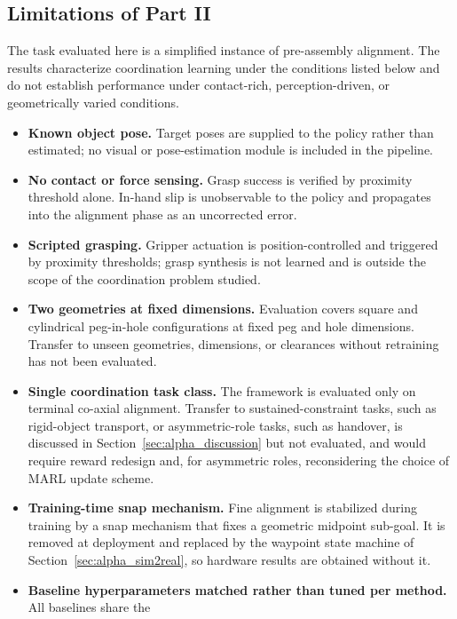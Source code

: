 \subsection{Limitations of Part II}\label{sec:alpha_limitations}

The task evaluated here is a simplified instance of pre-assembly alignment. The results characterize
coordination learning under the conditions listed below and do not establish performance under
contact-rich, perception-driven, or geometrically varied conditions.

\begin{itemize}
\item \textbf{Known object pose.} Target poses are supplied to the policy rather than estimated; no
visual or pose-estimation module is included in the pipeline.
\item \textbf{No contact or force sensing.} Grasp success is verified by proximity threshold alone.
In-hand slip is unobservable to the policy and propagates into the alignment phase as an uncorrected
error.
\item \textbf{Scripted grasping.} Gripper actuation is position-controlled and triggered by proximity
thresholds; grasp synthesis is not learned and is outside the scope of the coordination problem
studied.
\item \textbf{Two geometries at fixed dimensions.} Evaluation covers square and cylindrical
peg-in-hole configurations at fixed peg and hole dimensions. Transfer to unseen geometries,
dimensions, or clearances without retraining has not been evaluated.
\item \textbf{Single coordination task class.} The framework is evaluated only on terminal co-axial
alignment. Transfer to sustained-constraint tasks, such as rigid-object transport, or asymmetric-role
tasks, such as handover, is discussed in Section~\ref{sec:alpha_discussion} but not evaluated, and
would require reward redesign and, for asymmetric roles, reconsidering the choice of MARL update
scheme.
\item \textbf{Training-time snap mechanism.} Fine alignment is stabilized during training by a snap
mechanism that fixes a geometric midpoint sub-goal. It is removed at deployment and replaced by the
waypoint state machine of Section~\ref{sec:alpha_sim2real}, so hardware results are obtained without
it.
\item \textbf{Baseline hyperparameters matched rather than tuned per method.} All baselines share the

\end{itemize}
